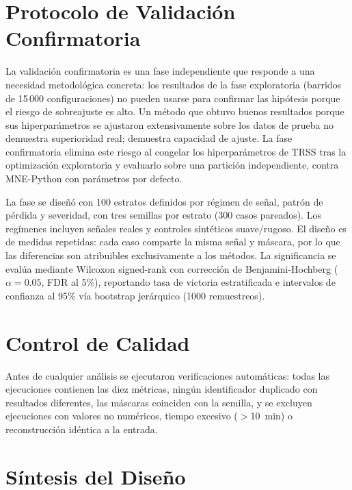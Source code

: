 \section{Protocolo de Validación Confirmatoria}
\label{sec:confirmatory}

La validación confirmatoria es una fase independiente que responde a una necesidad metodológica concreta: los resultados de la fase exploratoria (barridos de 15\,000 configuraciones) no pueden usarse para confirmar las hipótesis porque el riesgo de sobreajuste es alto. Un método que obtuvo buenos resultados porque sus hiperparámetros se ajustaron extensivamente sobre los datos de prueba no demuestra superioridad real; demuestra capacidad de ajuste. La fase confirmatoria elimina este riesgo al congelar los hiperparámetros de TRSS tras la optimización exploratoria y evaluarlo sobre una partición independiente, contra MNE-Python con parámetros por defecto.

La fase se diseñó con 100 estratos definidos por régimen de señal, patrón de pérdida y severidad, con tres semillas por estrato (300 casos pareados). Los regímenes incluyen señales reales y controles sintéticos suave/rugoso. El diseño es de medidas repetidas: cada caso comparte la misma señal y máscara, por lo que las diferencias son atribuibles exclusivamente a los métodos. La significancia se evalúa mediante Wilcoxon signed-rank con corrección de Benjamini-Hochberg ($\alpha=0.05$, FDR al 5\%), reportando tasa de victoria estratificada e intervalos de confianza al 95\% vía bootstrap jerárquico (1000 remuestreos).

\section{Control de Calidad}

Antes de cualquier análisis se ejecutaron verificaciones automáticas: todas las ejecuciones contienen las diez métricas, ningún identificador duplicado con resultados diferentes, las máscaras coinciden con la semilla, y se excluyen ejecuciones con valores no numéricos, tiempo excesivo ($>$10~min) o reconstrucción idéntica a la entrada.

\section{Síntesis del Diseño}

